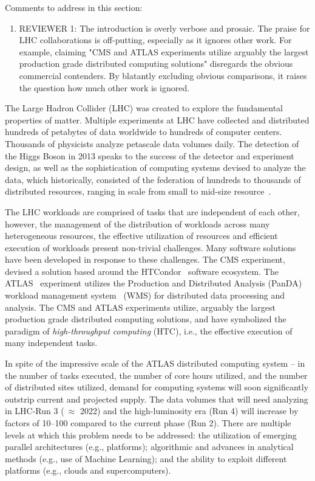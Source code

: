 \ifreview
Comments to address in this section:
\begin{enumerate}
	\color{red} 
	\item REVIEWER 1: The introduction is overly verbose and prosaic. The
	praise for LHC collaborations is off-putting, especially as it ignores
	other work. For example, claiming "CMS and ATLAS experiments utilize
	arguably the largest production grade distributed computing solutions"
	disregards the obvious commercial contenders. By blatantly excluding
	obvious comparisons, it raises the question how much other work is
	ignored.
\end{enumerate}
\fi

The Large Hadron Collider (LHC) was created to explore the fundamental
properties of matter. Multiple experiments at LHC have collected and
distributed hundreds of petabytes of data worldwide to hundreds of computer
centers. Thousands of physicists analyze petascale data volumes daily. The
detection of the Higgs Boson in 2013 speaks to the success of the detector
and experiment design, as well as the sophistication of computing systems
devised to analyze the data, which historically, consisted of the federation
of hundreds to thousands of distributed resources, ranging in scale from
small to mid-size resource~\cite{foster2003grid}.

The LHC workloads are comprised of tasks that are independent of each other,
however, the management of the distribution of workloads across many
heterogeneous resources, the effective utilization of resources and efficient
execution of workloads present non-trivial challenges. Many software solutions
have been developed in response to these challenges. The CMS experiment,
devised a solution based around the HTCondor~\cite{thain2005distributed}
software ecosystem. The ATLAS~\cite{Aad:2008} experiment utilizes the
Production and Distributed Analysis (PanDA) workload management
system~\cite{Maeno2011} (WMS) for distributed data processing and analysis.
The CMS and ATLAS experiments utilize, arguably the largest production grade
distributed computing solutions, and have symbolized the paradigm of {\it
high-throughput computing} (HTC), i.e., the effective execution of many
independent tasks.

In spite of the impressive scale of the ATLAS distributed computing system --
in the number of tasks executed, the number of core hours utilized, and the
number of distributed sites utilized,  demand for computing systems will soon
significantly outstrip current and projected supply.   The data volumes that
will need analyzing in LHC-Run 3 ($~\approx$ 2022) and the high-luminosity era
(Run 4) will increase by factors of 10--100 compared to the current phase (Run
2). There are multiple levels at which this problem needs to be addressed: the
utilization of emerging parallel architectures (e.g., platforms); algorithmic
and advances in analytical methods (e.g., use of Machine Learning); and the
ability to exploit different platforms (e.g., clouds and supercomputers).

